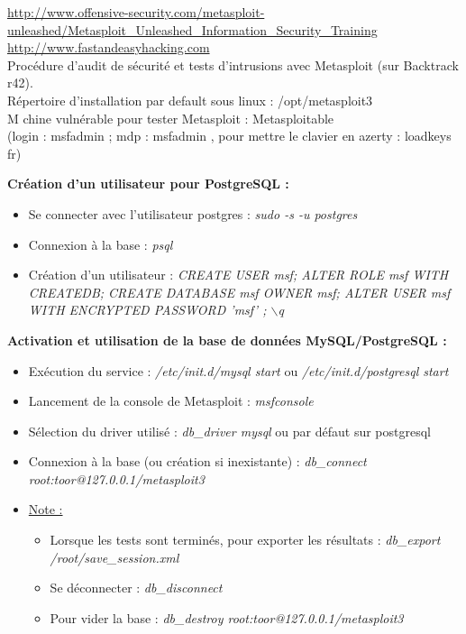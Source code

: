 \documentclass[a4paper,11pt]{article}				    %
\begin{document}
{
\url{http://www.offensive-security.com/metasploit-unleashed/Metasploit_Unleashed_Information_Security_Training}\\
\url{http://www.fastandeasyhacking.com}
}{
\\Proc\'edure d'audit de s\'ecurit\'e et tests d'intrusions avec Metasploit (sur Backtrack r42).\\
R\'epertoire d'installation par default sous linux : /opt/metasploit3\\
M	chine vuln\'erable pour tester Metasploit : Metasploitable\\
(login : msfadmin ; mdp : msfadmin , pour mettre le clavier en azerty : loadkeys fr)
}{
\textbf{Cr\'eation d'un utilisateur pour PostgreSQL :}
\begin{itemize}
	\item Se connecter avec l'utilisateur postgres : {\sl \color{blue}sudo -s -u postgres}
    \item Connexion \`a la base : {\sl \color{blue}psql}
    \item Cr\'eation d'un utilisateur : {\sl \color{blue}\footnotesize CREATE USER msf; ALTER ROLE msf WITH CREATEDB; CREATE DATABASE msf OWNER msf; ALTER USER msf WITH ENCRYPTED PASSWORD 'msf' ; $\backslash$q}
\end{itemize}

\textbf{Activation et utilisation de la base de donn\'ees MySQL/PostgreSQL :}
\begin{itemize}
	\item Ex\'ecution du service : {\sl \color{blue}/etc/init.d/mysql start} ou {\sl \color{blue}/etc/init.d/postgresql start}
	\item Lancement de la console de Metasploit : {\sl \color{blue}msfconsole}
	\item S\'election du driver utilis\'e : {\sl \color{blue}db\_driver mysql} ou par d\'efaut sur postgresql
	\item Connexion \`a la base (ou cr\'eation si inexistante) : {\sl \color{blue}db\_connect root:toor@127.0.0.1/metasploit3}
	\item \underline{Note :}
	\begin{itemize}
		\item Lorsque les tests sont termin\'es, pour exporter les r\'esultats : {\sl \color{blue}db\_export /root/save\_session.xml}
		\item Se d\'econnecter : {\sl \color{blue}db\_disconnect}
		\item Pour vider la base : {\sl \color{blue}db\_destroy root:toor@127.0.0.1/metasploit3}
	\end{itemize}
\end{itemize}

}
\end{document}
